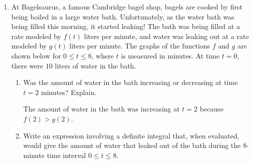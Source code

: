 \documentclass{article}
\begin{document}
\begin{enumerate}
\begin{enumerate}
\end{enumerate}

\pspace{\newpage}

\item 
\begin{problem}
    At Bagelsaurus, a famous Cambridge bagel shop, bagels are cooked by first being boiled in a large water bath. Unfortunately, as the water bath was being filled this morning, it started leaking! The bath was being filled at a rate modeled by $f(t)$ liters per minute, and water was leaking out at a rate modeled by $g(t)$ liters per minute. The graphs of the functions $f$ and $g$ are shown below for $0\leq t \leq 8$, where $t$ is measured in minutes. At time $t=0$, there were $10$ liters of water in the bath.

\vspace{-12pt}
    \begin{center}
    \end{center}
    \vspace{-18pt}
\end{problem}

\begin{enumerate}

    \item 
    \begin{problem}
        Was the amount of water in the bath increasing or decreasing at time $t=2$ minutes? Explain.
    \end{problem}
    \pspace{\vfill}

\begin{solution}
    The amount of water in the bath was increasing at $t=2$ because $f(2)>g(2)$.
\end{solution}
    \item 
    \begin{problem}
        Write an expression involving a definite integral that, when evaluated, would give the amount of water that leaked out of the bath during the 8-minute time interval $0\leq t \leq 8$.
    \end{problem}
    \pspace{\vfill}


\end{enumerate}
\end{enumerate}
\end{document}
